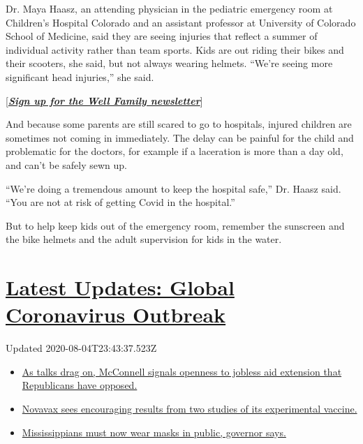 Dr. Maya Haasz, an attending physician in the pediatric emergency room
at Children's Hospital Colorado and an assistant professor at University
of Colorado School of Medicine, said they are seeing injuries that
reflect a summer of individual activity rather than team sports. Kids
are out riding their bikes and their scooters, she said, but not always
wearing helmets. ``We're seeing more significant head injuries,'' she
said.

{[}\textbf{\href{https://www.nytimes.com/newsletters/well-family}{\emph{Sign
up for the Well Family newsletter}}}{]}

And because some parents are still scared to go to hospitals, injured
children are sometimes not coming in immediately. The delay can be
painful for the child and problematic for the doctors, for example if a
laceration is more than a day old, and can't be safely sewn up.

``We're doing a tremendous amount to keep the hospital safe,'' Dr. Haasz
said. ``You are not at risk of getting Covid in the hospital.''

But to help keep kids out of the emergency room, remember the sunscreen
and the bike helmets and the adult supervision for kids in the water.

\hypertarget{latest-updates-global-coronavirus-outbreak}{%
\section{\texorpdfstring{\href{https://www.nytimes.com/2020/08/04/world/coronavirus-cases.html?action=click\&pgtype=Article\&state=default\&region=MAIN_CONTENT_1\&context=storylines_live_updates}{Latest
Updates: Global Coronavirus
Outbreak}}{Latest Updates: Global Coronavirus Outbreak}}\label{latest-updates-global-coronavirus-outbreak}}

Updated 2020-08-04T23:43:37.523Z

\begin{itemize}
\tightlist
\item
  \href{https://www.nytimes.com/2020/08/04/world/coronavirus-cases.html?action=click\&pgtype=Article\&state=default\&region=MAIN_CONTENT_1\&context=storylines_live_updates\#link-2daa96b5}{As
  talks drag on, McConnell signals openness to jobless aid extension
  that Republicans have opposed.}
\item
  \href{https://www.nytimes.com/2020/08/04/world/coronavirus-cases.html?action=click\&pgtype=Article\&state=default\&region=MAIN_CONTENT_1\&context=storylines_live_updates\#link-1228a480}{Novavax
  sees encouraging results from two studies of its experimental
  vaccine.}
\item
  \href{https://www.nytimes.com/2020/08/04/world/coronavirus-cases.html?action=click\&pgtype=Article\&state=default\&region=MAIN_CONTENT_1\&context=storylines_live_updates\#link-794484ed}{Mississippians
  must now wear masks in public, governor says.}
\end{itemize}

